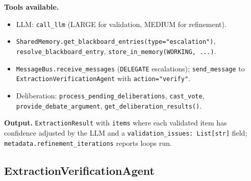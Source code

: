 \documentclass{article}
\begin{document}
\begin{agentbox}
\textbf{Tools available.}
\begin{itemize}[leftmargin=*,nosep]
\item LLM: \texttt{call\_llm} (LARGE for validation, MEDIUM for refinement).
\item \texttt{SharedMemory.get\_blackboard\_entries(type="escalation")}, \texttt{resolve\_blackboard\_entry}, \texttt{store\_in\_memory(WORKING, ...)}.
\item \texttt{MessageBus.receive\_messages} (\texttt{DELEGATE} escalations); \texttt{send\_message} to \texttt{ExtractionVerificationAgent} with \texttt{action="verify"}.
\item Deliberation: \texttt{process\_pending\_deliberations}, \texttt{cast\_vote}, \texttt{provide\_debate\_argument}, \texttt{get\_deliberation\_results()}.
\end{itemize}

\textbf{Output.} \texttt{ExtractionResult} with \texttt{items} where each validated item has confidence adjusted by the LLM and a \texttt{validation\_issues: List[str]} field; \texttt{metadata.refinement\_iterations} reports loops run.
\end{agentbox}

\newpage
\subsection{ExtractionVerificationAgent}
\label{app:verification_agent}
\end{document}
